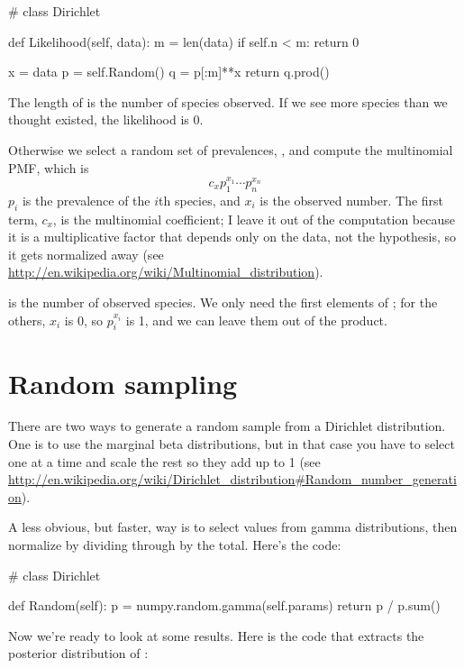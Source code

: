 \documentclass[12pt]{book}
\theoremstyle{exercise}
\begin{document}
\begin{code}
# class Dirichlet

    def Likelihood(self, data):
        m = len(data)
        if self.n < m:
            return 0

        x = data
        p = self.Random()
        q = p[:m]**x
        return q.prod()
\end{code}

The length of  is the number of species observed.  If
we see more species than we thought existed, the likelihood is 0.

Otherwise we select a random set of prevalences, , and
compute the multinomial PMF, which is
%
\[ c_x  p_1^{x_1} \cdots p_n^{x_n} \]
%
$p_i$ is the prevalence of the $i$th species, and $x_i$ is the
observed number.  The first term, $c_x$, is the multinomial
coefficient; I leave it out of the computation because it is
a multiplicative factor that depends only
on the data, not the hypothesis, so it gets normalized away
(see \url{http://en.wikipedia.org/wiki/Multinomial_distribution}).

 is the number of observed species.
We only need the first  elements of ;
for the others, $x_i$ is 0, so
$p_i^{x_i}$ is 1, and we can leave them out of the product.


\section{Random sampling}
\label{randomdir}

There are two ways to generate a random sample from a Dirichlet
distribution.  One is to use the marginal beta distributions, but in
that case you have to select one at a time and scale the rest so they
add up to 1 (see
\url{http://en.wikipedia.org/wiki/Dirichlet_distribution#Random_number_generation}).

A less obvious, but faster, way is to select values from  gamma
distributions, then normalize by dividing through by the total. 
Here's the code:

\begin{code}
# class Dirichlet

    def Random(self):
        p = numpy.random.gamma(self.params)
        return p / p.sum()
\end{code}

Now we're ready to look at some results.  Here is the code that extracts
the posterior distribution of :
\end{document}
